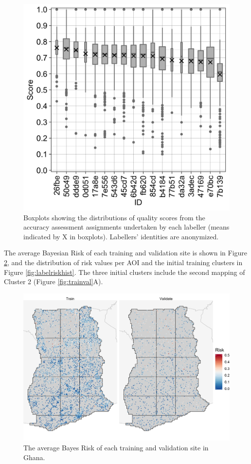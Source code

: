 \documentclass[
  11pt,
  a4paper]{article}
\begin{document}
\begin{figure}[!ht]

{\centering \includegraphics[width=0.7\linewidth,]{figures/si_label_quality} 

}

\caption{Boxplots showing the distributions of quality scores from the accuracy assessment assignments undertaken by each labeller (means indicated by X in boxplots). Labellers' identities are anonymized.}\label{fig:labelqual}
\end{figure}

The average Bayesian Risk of each training and validation site is shown
in Figure \ref{fig:labelrisk}, and the distribution of risk values per
AOI and the initial training clusters in Figure \ref{fig:labelriskhist}.
The three initial clusters include the second mapping of Cluster 2
(Figure \ref{fig:trainval}A).

\begin{figure}[!ht]

{\centering \includegraphics[width=0.8\linewidth,]{figures/si_label_risk_map} 

}

\caption{The average Bayes Risk of each training and validation site in Ghana.}\label{fig:labelrisk}
\end{figure}
\end{document}
